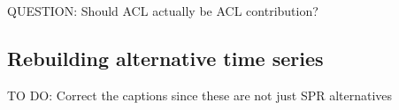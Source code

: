 \documentclass[11pt,
  english,
  a4paper,
]{article}
\begin{document}
\endgroup{}


QUESTION: Should ACL actually be ACL contribution?

\leavevmode\tagmcend\tagstructend\par

\clearpage


\hypertarget{rebuilding-alternative-time-series}{%
\subsection{Rebuilding alternative time series}\label{rebuilding-alternative-time-series}}

\leavevmode\tagmcend\tagstructend


TO DO: Correct the captions since these are not just SPR alternatives

\leavevmode\tagmcend\tagstructend\par

\begingroup\fontsize{10}{12}\selectfont
\begingroup\fontsize{10}{12}\selectfont
\end{document}
